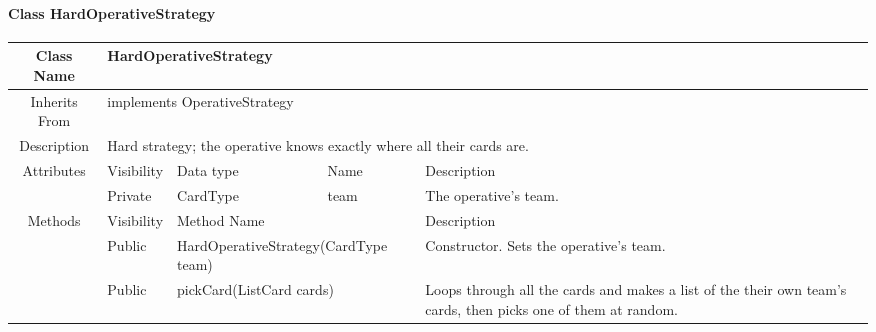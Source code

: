 \paragraph{Class HardOperativeStrategy}\mbox{}
\begin{tabularx}{\textwidth}{|c||l|l|l|X|}
    \hline
    \cellcolor{lightgray}Class Name & \multicolumn{4}{X|}{HardOperativeStrategy}\\
    \hline
    \cellcolor{lightgray}Inherits From & \multicolumn{4}{X|}{implements OperativeStrategy}\\
    \hline
    \cellcolor{lightgray}Description & \multicolumn{4}{p{12cm}|}{Hard strategy; the operative knows exactly where all their cards are.}\\
    \hline\hline
    
    \cellcolor{lightgray}Attributes & \cellcolor{lightgray}Visibility & \cellcolor{lightgray}Data type & \cellcolor{lightgray}Name & \cellcolor{lightgray}Description\\\cline{2-5}
    \cellcolor{lightgray} & Private & CardType & team & The operative's team.\\
    \hline\hline
    
    \cellcolor{lightgray}Methods & \cellcolor{lightgray}Visibility & \multicolumn{2}{l|}{\cellcolor{lightgray}Method Name} & \cellcolor{lightgray}Description\\\cline{2-5}
    \hline
    \cellcolor{lightgray} & Public & \multicolumn{2}{l|}{HardOperativeStrategy(CardType team)} & Constructor. Sets the operative's team.\\
    \hline
    \cellcolor{lightgray} & Public & \multicolumn{2}{l|}{pickCard(List\textlangle{}Card\textrangle{} cards)} & Loops through all the cards and makes a list of the their own team's cards, then picks one of them at random.\\
    \hline
\end{tabularx}